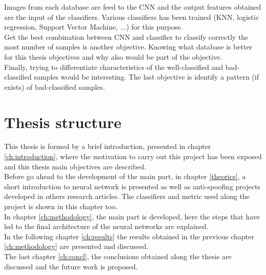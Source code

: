 Images from each database are feed to the CNN and the output features obtained are the input of the classifiers. Various classifiers has been trained (KNN, logistic regression, Support Vector Machine, ...) for this purpose.\\

Get the best combination between CNN and classifier to classify correctly the most number of samples is another objective. Knowing what database is better for this thesis objectives and why also would be part of the objective.\\

Finally, trying to differentiate characteristics of the well-classified and bad-classified samples would be interesting. The last objective is identify a pattern (if exists) of bad-classified samples.\\

\section{Thesis structure}
This thesis is formed by a brief introduction, presented in chapter \ref{ch:introduction}, where the motivation to carry out this project has been exposed and this thesis main objectives are described.\\

Before go ahead to the development of the main part, in chapter \ref{theorics}, a short introduction to neural network is presented as well as anti-spoofing projects developed in others research articles. The classifiers and metric used along the project is shown in this chapter too.\\

In chapter \ref{ch:methodology}, the main part is developed, here the steps that have led to the final architecture of the neural networks are explained.\\

In the following chapter \ref{ch:results} the results obtained in the previous chapter \ref{ch:methodology} are presented and discussed.\\

The last chapter \ref{ch:concl}, the conclusions obtained along the thesis are discussed and the future work is proposed.\\

 
  